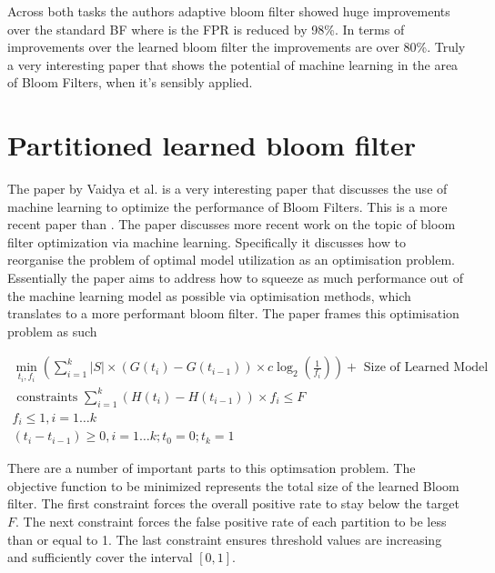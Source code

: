 \documentclass[MScCS]{uccthesis}
\begin{document}
Across both tasks the authors adaptive bloom filter showed huge improvements over the standard BF where is the FPR is reduced by 98\%. In terms of improvements over the learned bloom filter the improvements are over 80\%. Truly a very interesting paper that shows the potential of machine learning in the area of Bloom Filters, when it's sensibly applied.

\section{Partitioned learned bloom filter}
The paper by Vaidya et al. \cite{vaidya2020partitioned} is a very interesting paper that discusses the use of machine learning to optimize the performance of Bloom Filters. This is a more recent paper than \cite{dai2019adaptive}. The paper discusses more recent work on the topic of bloom filter optimization via machine learning. Specifically it discusses how to reorganise the problem of optimal model utilization as an optimisation problem. Essentially the paper aims to address how to squeeze as much performance out of the machine learning model as possible via optimisation methods, which translates to a more performant bloom filter. The paper frames this optimisation problem as such

$$
    \begin{gathered}
        \min _{t_{i}, f_{i}}\left(\sum_{i=1}^{k}|S| \times\left(G\left(t_{i}\right)-G\left(t_{i-1}\right)\right) \times c \log _{2}\left(\frac{1}{f_{i}}\right)\right)+\text { Size of Learned Model } \\
        \text { constraints } \sum_{i=1}^{k}\left(H\left(t_{i}\right)-H\left(t_{i-1}\right)\right) \times f_{i} \leq F \\
        f_{i} \leq 1, i=1 \ldots k \\
        \left(t_{i}-t_{i-1}\right) \geq 0, i=1 \ldots k ; t_{0}=0 ; t_{k}=1
    \end{gathered}
$$

There are a number of important parts to this optimsation problem. The objective function to be minimized represents the total size of the learned Bloom filter. The first constraint forces the overall positive rate to stay below the target $F$. The next constraint forces the false positive rate of each partition to be less than or equal to 1. The last constraint ensures threshold values are increasing and sufficiently cover the interval $[0,1]$.



%
%
\backmatter
%
%
\printbibliography
\end{document}

